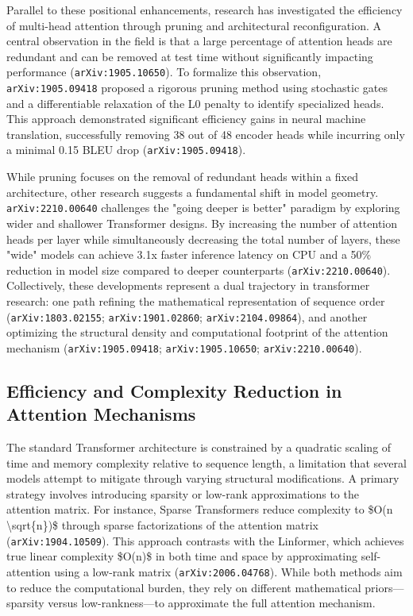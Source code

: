 \documentclass[11pt]{article}
\begin{document}
Parallel to these positional enhancements, research has investigated the efficiency of multi-head attention through pruning and architectural reconfiguration. A central observation in the field is that a large percentage of attention heads are redundant and can be removed at test time without significantly impacting performance (\texttt{arXiv:1905.10650}). To formalize this observation, \texttt{arXiv:1905.09418} proposed a rigorous pruning method using stochastic gates and a differentiable relaxation of the L0 penalty to identify specialized heads. This approach demonstrated significant efficiency gains in neural machine translation, successfully removing 38 out of 48 encoder heads while incurring only a minimal 0.15 BLEU drop (\texttt{arXiv:1905.09418}).

While pruning focuses on the removal of redundant heads within a fixed architecture, other research suggests a fundamental shift in model geometry. \texttt{arXiv:2210.00640} challenges the "going deeper is better" paradigm by exploring wider and shallower Transformer designs. By increasing the number of attention heads per layer while simultaneously decreasing the total number of layers, these "wide" models can achieve 3.1x faster inference latency on CPU and a 50\% reduction in model size compared to deeper counterparts (\texttt{arXiv:2210.00640}). Collectively, these developments represent a dual trajectory in transformer research: one path refining the mathematical representation of sequence order (\texttt{arXiv:1803.02155}; \texttt{arXiv:1901.02860}; \texttt{arXiv:2104.09864}), and another optimizing the structural density and computational footprint of the attention mechanism (\texttt{arXiv:1905.09418}; \texttt{arXiv:1905.10650}; \texttt{arXiv:2210.00640}).

\subsection{Efficiency and Complexity Reduction in Attention Mechanisms}

The standard Transformer architecture is constrained by a quadratic scaling of time and memory complexity relative to sequence length, a limitation that several models attempt to mitigate through varying structural modifications. A primary strategy involves introducing sparsity or low-rank approximations to the attention matrix. For instance, Sparse Transformers reduce complexity to \$O(n \textbackslash{}sqrt\{n\})\$ through sparse factorizations of the attention matrix (\texttt{arXiv:1904.10509}). This approach contrasts with the Linformer, which achieves true linear complexity \$O(n)\$ in both time and space by approximating self-attention using a low-rank matrix (\texttt{arXiv:2006.04768}). While both methods aim to reduce the computational burden, they rely on different mathematical priors—sparsity versus low-rankness—to approximate the full attention mechanism.
\end{document}
